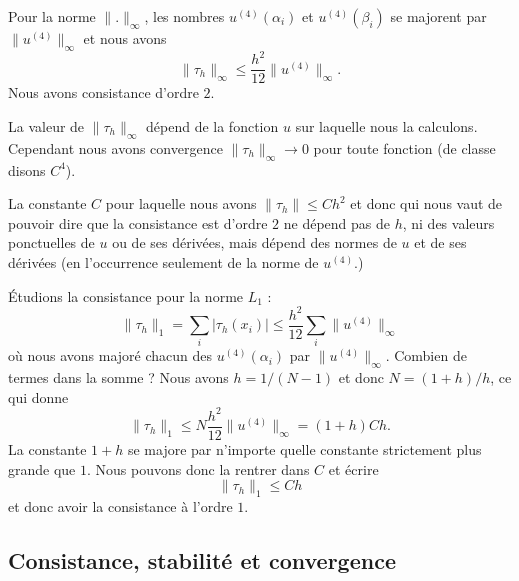 Pour la norme \(  \| . \|_{\infty}\), les nombres \( u^{(4)}(\alpha_i)\) et \( u^{(4)}(\beta_i)\) se majorent par \(  \| u^{(4)} \|_{\infty}\) et nous avons
\begin{equation}
	\| \tau_h \|_{\infty}\leq \frac{ h^2 }{ 12 }\| u^{(4)} \|_{\infty}.
\end{equation}
Nous avons consistance d'ordre \( 2\).

\begin{remark}
	La valeur de \( \| \tau_h \|_{\infty}\) dépend de la fonction \( u\) sur laquelle nous la calculons. Cependant nous avons convergence \( \| \tau_h \|_{\infty}\to 0\) pour toute fonction (de classe disons \( C^4\)).

	La constante \( C\) pour laquelle nous avons \( \| \tau_h \|\leq Ch^2\) et donc qui nous vaut de pouvoir dire que la consistance est d'ordre \( 2\) ne dépend pas de \( h\), ni des valeurs ponctuelles de \( u\) ou de ses dérivées, mais dépend des normes de \( u\) et de ses dérivées (en l'occurrence seulement de la norme de \( u^{(4)}\).)
\end{remark}

Étudions la consistance pour la norme \( L_1\) :
\begin{equation}
	\| \tau_h \|_1=\sum_i| \tau_h(x_i) |\leq \frac{ h^2 }{ 12 }\sum_i\| u^{(4)} \|_{\infty}
\end{equation}
où nous avons majoré chacun des \( u^{(4)}(\alpha_i)\) par \( \| u^{(4)} \|_{\infty}\). Combien de termes dans la somme ? Nous avons \( h=1/(N-1)\) et donc \( N=(1+h)/h\), ce qui donne
\begin{equation}
	\| \tau_h \|_1\leq N\frac{ h^2 }{ 12 }\| u^{(4)} \|_{\infty}=(1+h)Ch.
\end{equation}
La constante \( 1+h\) se majore par n'importe quelle constante strictement plus grande que \( 1\). Nous pouvons donc la rentrer dans \( C\) et écrire
\begin{equation}
	\| \tau_h \|_1\leq Ch
\end{equation}
et donc avoir la consistance à l'ordre \( 1\).

\subsection{Consistance, stabilité et convergence}

